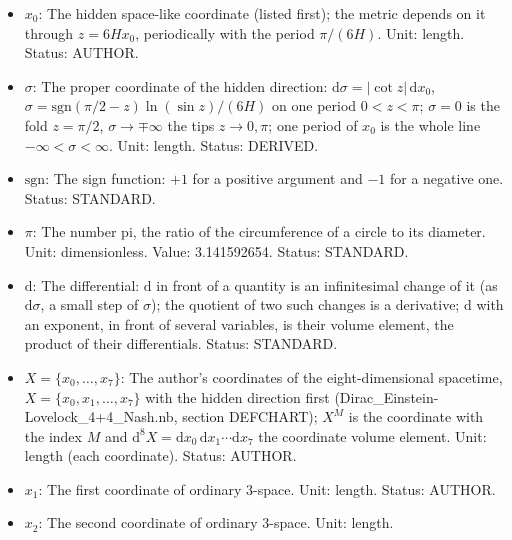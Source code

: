 \documentclass[
  10pt,
]{article}
\begin{document}
\begin{itemize}
  \(\pi/(6H)\) of \(x_0\), the warp factor
  \(\mathrm{e}^{-2H\lvert\sigma\rvert}\) of the metric, the cosmological
  constant \(\Lambda = -21H^2\) and the tension
  \(\kappa\lambda_{\mathrm{F}} = 12H\) of the fold; in UM-4 a free
  parameter, bounded from below by the propagation of the gauge fields
  in the bulk. Unit: GeV (1/length). Value: \(H > 2534\) GeV, about 2.5
  TeV (from the invisible width of the Z boson). Status: AUTHOR.
\item
  \(x_0\): The hidden space-like coordinate (listed first); the metric
  depends on it through \(z = 6Hx_0\), periodically with the period
  \(\pi/(6H)\). Unit: length. Status: AUTHOR.
\item
  \(\sigma\): The proper coordinate of the hidden direction:
  \(\mathrm{d}\sigma = \lvert\cot z\rvert\,\mathrm{d}x_0\),
  \(\sigma = \mathrm{sgn}(\pi/2 - z)\ln(\sin z)/(6H)\) on one period
  \(0 < z < \pi\); \(\sigma = 0\) is the fold \(z = \pi/2\),
  \(\sigma \to \mp\infty\) the tips \(z \to 0, \pi\); one period of
  \(x_0\) is the whole line \(-\infty < \sigma < \infty\). Unit: length.
  Status: DERIVED.
\item
  \(\mathrm{sgn}\): The sign function: \(+1\) for a positive argument
  and \(-1\) for a negative one. Status: STANDARD.
\item
  \(\pi\): The number pi, the ratio of the circumference of a circle to
  its diameter. Unit: dimensionless. Value: 3.141592654. Status:
  STANDARD.
\item
  \(\mathrm{d}\): The differential: \(\mathrm{d}\) in front of a
  quantity is an infinitesimal change of it (as \(\mathrm{d}\sigma\), a
  small step of \(\sigma\)); the quotient of two such changes is a
  derivative; \(\mathrm{d}\) with an exponent, in front of several
  variables, is their volume element, the product of their
  differentials. Status: STANDARD.
\item
  \(X = \{x_0, \dots, x_7\}\): The author's coordinates of the
  eight-dimensional spacetime, \(X = \{x_0, x_1, \dots, x_7\}\) with the
  hidden direction first (Dirac\_Einstein-Lovelock\_4+4\_Nash.nb,
  section DEFCHART); \(X^M\) is the coordinate with the index \(M\) and
  \(\mathrm{d}^8X = \mathrm{d}x_0\,\mathrm{d}x_1\cdots\mathrm{d}x_7\)
  the coordinate volume element. Unit: length (each coordinate). Status:
  AUTHOR.
\item
  \(x_1\): The first coordinate of ordinary 3-space. Unit: length.
  Status: AUTHOR.
\item
  \(x_2\): The second coordinate of ordinary 3-space. Unit: length.

\end{itemize}
\end{document}
